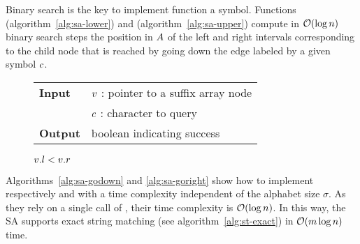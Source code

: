 Binary search is the key to implement function  a symbol.
Functions  (algorithm~\ref{alg:sa-lower}) and  (algorithm~\ref{alg:sa-upper}) compute in $\mathcal{O}(\log{n})$ binary search steps the position in $A$ of the left and right intervals corresponding to the child node that is reached by going down the edge labeled by a given symbol $c$.

\begin{figure*}[b!]
\begin{center}
\begin{minipage}[t]{.6\textwidth}
\begin{algorithm}[H]
\begin{tabular}{ll}
\textbf{Input}  & $v$ : pointer to a suffix array node\\
				& $c$ : character to query\\
\textbf{Output} & boolean indicating success\\
\end{tabular}
\begin{algorithmic}[1]
	\State \Return \False
\EndIf
{}
\State \Return $v.l < v.r$
\end{algorithmic}
\label{alg:sa-godownc}
\end{algorithm}
\end{minipage}
\end{center}
\end{figure*}

Algorithms~\ref{alg:sa-godown} and \ref{alg:sa-goright} show how to implement respectively  and  with a time complexity independent of the alphabet size $\sigma$.
As they rely on a single call of , their time complexity is $\mathcal{O}(\log{n})$.
In this way, the SA supports exact string matching (see algorithm~\ref{alg:st-exact}) in $\mathcal{O}(m \log{n})$ time.

